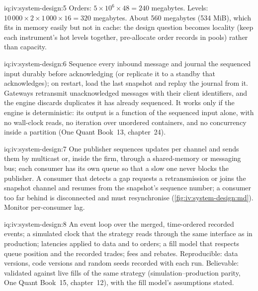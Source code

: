 \begin{solution}{iq:iv:system-design:5}
Orders: $5 \times 10^6 \times 48 = 240$ megabytes. Levels: $10\,000 \times 2 \times 1\,000 \times 16 = 320$ megabytes. About 560
megabytes (534 MiB), which fits in memory easily but not in cache: the design question becomes locality (keep each instrument's hot
levels together, pre-allocate order records in pools) rather than capacity.
\end{solution}

\begin{solution}{iq:iv:system-design:6}
Sequence every inbound message and journal the sequenced input durably before acknowledging (or replicate it to a standby that
acknowledges); on restart, load the last snapshot and replay the journal from it. Gateways retransmit unacknowledged messages with
their client identifiers, and the engine discards duplicates it has already sequenced. It works only if the engine is deterministic:
its output is a function of the sequenced input alone, with no wall-clock reads, no iteration over unordered containers, and no
concurrency inside a partition (One Quant Book~13, chapter~24).
\end{solution}

\begin{solution}{iq:iv:system-design:7}
One publisher sequences updates per channel and sends them by multicast or, inside the firm, through a shared-memory or messaging
bus; each consumer has its own queue so that a slow one never blocks the publisher. A consumer that detects a gap requests a
retransmission or joins the snapshot channel and resumes from the snapshot's sequence number; a consumer too far behind is
disconnected and must resynchronise (\cref{fig:iv:system-design:md}). Monitor per-consumer lag.
\end{solution}

\begin{solution}{iq:iv:system-design:8}
An event loop over the merged, time-ordered recorded events; a simulated clock that the strategy reads through the same interface as
in production; latencies applied to data and to orders; a fill model that respects queue position and the recorded trades; fees and
rebates. Reproducible: data versions, code versions and random seeds recorded with each run. Believable: validated against live
fills of the same strategy (simulation--production parity, One Quant Book~15, chapter~12), with the fill model's assumptions stated.
\end{solution}

